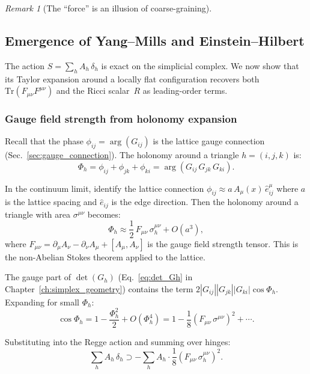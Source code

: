 \documentclass[12pt]{article}
\theoremstyle{remark}
\newtheorem{remark}[theorem]{Remark}
\theoremstyle{definition}
\begin{document}
\begin{remark}[The ``force'' is an illusion of coarse-graining]
\subsection{Emergence of Yang--Mills and Einstein--Hilbert}
\label{sec:emergence_YM_EH}

The action $S = \sum_h A_h\,\delta_h$ is exact on the simplicial complex.  We now show that its Taylor expansion around a locally flat configuration recovers both $\text{Tr}(F_{\mu\nu}F^{\mu\nu})$ and the Ricci scalar~$R$ as leading-order terms.

\subsubsection{Gauge field strength from holonomy expansion}

Recall that the phase $\phi_{ij} = \arg(G_{ij})$ is the lattice gauge connection (Sec.~\ref{sec:gauge_connection}).  The holonomy around a triangle $h = (i,j,k)$ is:
\begin{equation}
\Phi_h = \phi_{ij} + \phi_{jk} + \phi_{ki} = \arg(G_{ij}\,G_{jk}\,G_{ki}).
\end{equation}

In the continuum limit, identify the lattice connection $\phi_{ij} \approx a\,A_\mu(x)\,\hat{e}^\mu_{ij}$ where $a$ is the lattice spacing and $\hat{e}_{ij}$ is the edge direction.  Then the holonomy around a triangle with area $\sigma^{\mu\nu}$ becomes:
\begin{equation}
\Phi_h \approx \frac{1}{2}\,F_{\mu\nu}\,\sigma^{\mu\nu}_h + O(a^3),
\end{equation}
where $F_{\mu\nu} = \partial_\mu A_\nu - \partial_\nu A_\mu + [A_\mu, A_\nu]$ is the gauge field strength tensor.  This is the non-Abelian Stokes theorem applied to the lattice.

The gauge part of $\det(G_h)$ (Eq.~\ref{eq:det_Gh} in Chapter~\ref{ch:simplex_geometry}) contains the term $2|G_{ij}||G_{jk}||G_{ki}|\cos\Phi_h$.  Expanding for small $\Phi_h$:
\begin{equation}
\cos\Phi_h = 1 - \frac{\Phi_h^2}{2} + O(\Phi_h^4) = 1 - \frac{1}{8}(F_{\mu\nu}\,\sigma^{\mu\nu})^2 + \cdots.
\end{equation}

Substituting into the Regge action and summing over hinges:
\begin{equation}
\sum_h A_h\,\delta_h \supset -\sum_h A_h \cdot \frac{1}{8}(F_{\mu\nu}\,\sigma^{\mu\nu}_h)^2.
\end{equation}


\end{remark}
\end{document}
